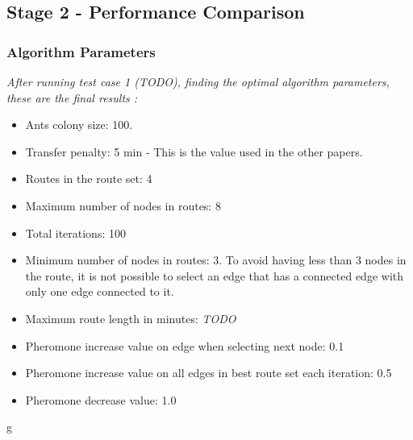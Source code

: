 \subsection{Stage 2 - Performance Comparison}

\subsubsection{Algorithm Parameters}
\emph{\color{red} After running test case 1 (TODO), finding the optimal algorithm parameters, these are the final results :}

\begin{itemize}
\item Ants colony size: 100.
\item Transfer penalty: 5 min - This is the value used in the other papers. 
\item Routes in the route set: 4
\item Maximum number of nodes in routes: 8
\item Total iterations: 100
\item Minimum number of nodes in routes: 3. To avoid having less than 3 nodes in the route, it is not possible to select an edge that has a connected edge with only one edge connected to it.
\item Maximum route length in minutes: \emph{\color{red} TODO}
\item Pheromone increase value on edge when selecting next node: 0.1
\item Pheromone increase value on all edges in best route set each iteration: 0.5
\item Pheromone decrease value: 1.0
\end{itemize}

g